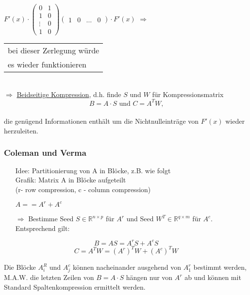 $F'(x) \cdot \begin{pmatrix}
0 &1\\1&0\\ \vdots&0\\1&0
\end{pmatrix}
\begin{pmatrix}
1 & 0 & \dots &0
\end{pmatrix}
\cdot F'(x)$
$\Rightarrow$ \begin{tabular}{l}bei dieser Zerlegung würde\\es wieder funktionieren\end{tabular}\\

\noindent
$\Rightarrow$ \underline{Beidseitige Kompression}, d.h. finde $S$ und $W$ für Kompressionsmatrix\\
$$B=A\cdot S \text{ und } C=A^TW\text{,}$$\\
die genügend Informationen enthält um die Nichtnulleinträge von $F'(x)$ wieder herzuleiten.

\subsubsection{Coleman und Verma}
\label{subsubsec:part_row/column_compr}

\begin{itemize}
	\item[Idee:] Partitionierung von A in Blöcke, z.B. wie folgt\\
	Grafik: Matrix A in Blöcke aufgeteilt\\
	(r- row compression, c - column compression)\\
	\vspace{2cm}
	
	$A=$\hspace{6cm}$=A^r+A^c$
	\vspace{2cm}
\end{itemize}
\begin{itemize}
	\item[$\Rightarrow$] Bestimme Seed $S \in \mathbb{R}^{n\times p}$ für $A^r$ und Seed $W^T \in \mathbb{R}^{q\times m}$ für $A^c$.\\
	
	Entsprechend gilt:
\end{itemize}
$$B=AS = A^rS + A^cS$$
$$C = A^TW = (A^r)^TW + (A^c)^TW$$

Die Blöcke $A_i^R$ und $A_j^c$ können nacheinander ausgehend von $A_1^r$ bestimmt werden,\\
M.A.W. die letzten Zeilen von $B=A\cdot S$ hängen nur von $A^r$ ab und können mit Standard Spaltenkompression ermittelt werden.

